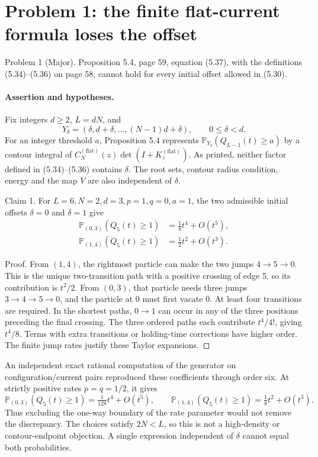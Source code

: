 \documentclass[10pt]{article}
\begin{document}
\section*{Problem 1: the finite flat-current formula loses the offset}
Problem 1 (Major).  Proposition 5.4, page 59, equation (5.37), with the definitions (5.34)–(5.36) on page 58, cannot hold for every initial offset allowed in (5.30).\par
\paragraph*{Assertion and hypotheses.}\mbox{}\par
Fix integers \(d\geq2\), \(L=dN\), and \[Y_\delta=(\delta,d+\delta,\ldots,(N-1)d+\delta),\qquad 0\leq\delta<d.\] For an integer threshold \(a\), Proposition 5.4 represents \(\mathbb P_{Y_\delta}(Q_{L-1}(t)\geq a)\) by a contour integral of \(C_N^{(\mathrm{flat})}(z)\det(I+K_z^{(\mathrm{flat})})\). As printed, neither factor defined in (5.34)–(5.36) contains \(\delta\). The root sets, contour radius condition, energy and the map \(V\) are also independent of \(\delta\).\par
Claim 1.  For \(L=6,N=2,d=3,p=1,q=0,a=1\), the two admissible initial offsets \(\delta=0\) and \(\delta=1\) give \[\begin{aligned}
 \mathbb P_{(0,3)}(Q_5(t)\geq1)&=\tfrac18t^4+O(t^5),\\
 \mathbb P_{(1,4)}(Q_5(t)\geq1)&=\tfrac12t^2+O(t^3).\end{aligned}\]\par
Proof. From \((1,4)\), the rightmost particle can make the two jumps \(4\to5\to0\). This is the unique two-transition path with a positive crossing of edge 5, so its contribution is \(t^2/2\). From \((0,3)\), that particle needs three jumps \(3\to4\to5\to0\), and the particle at 0 must first vacate 0. At least four transitions are required. In the shortest paths, \(0\to1\) can occur in any of the three positions preceding the final crossing. The three ordered paths each contribute \(t^4/4!\), giving \(t^4/8\). Terms with extra transitions or holding-time corrections have higher order. The finite jump rates justify these Taylor expansions. ◻\par
An independent exact rational computation of the generator on configuration/current pairs reproduced these coefficients through order six. At strictly positive rates \(p=q=1/2\), it gives \[\mathbb P_{(0,3)}(Q_5(t)\geq1)=\tfrac1{128}t^4+O(t^5),\qquad
 \mathbb P_{(1,4)}(Q_5(t)\geq1)=\tfrac18t^2+O(t^3).\] Thus excluding the one-way boundary of the rate parameter would not remove the discrepancy. The choices satisfy \(2N<L\), so this is not a high-density or contour-endpoint objection. A single expression independent of \(\delta\) cannot equal both probabilities.\par
\end{document}

